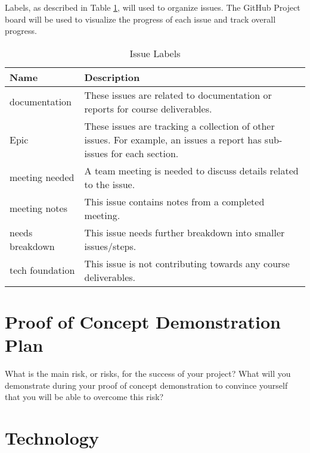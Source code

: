 \documentclass{article}
\begin{document}
Labels, as described in Table \ref{issueLabels}, will used to organize issues. The GitHub Project
board will be used to visualize the progress of each issue and track overall progress.

\begin{table}[H]
  \centering
  \caption{Issue Labels}
  \vspace{5pt}
  \begin{tabular}{|p{}|p{}|}
      \hline
      \textbf{Name} & \textbf{Description}\\
      \hline
      documentation & These issues are related to documentation or reports for course deliverables.\\
      \hline
      Epic & These issues are tracking a collection of other issues. For example, an issues a report
      has sub-issues for each section.\\
      \hline
      meeting needed & A team meeting is needed to discuss details related to the issue.\\
      \hline
      meeting notes & This issue contains notes from a completed meeting.\\
      \hline
      needs breakdown & This issue needs further breakdown into smaller issues/steps.\\
      \hline
      tech foundation & This issue is not contributing towards any course deliverables.\\
      \hline
  \end{tabular}

  \label{issueLabels}
\end{table}


\section{Proof of Concept Demonstration Plan}

What is the main risk, or risks, for the success of your project?  What will you
demonstrate during your proof of concept demonstration to convince yourself that
you will be able to overcome this risk?

\section{Technology}

\end{document}
